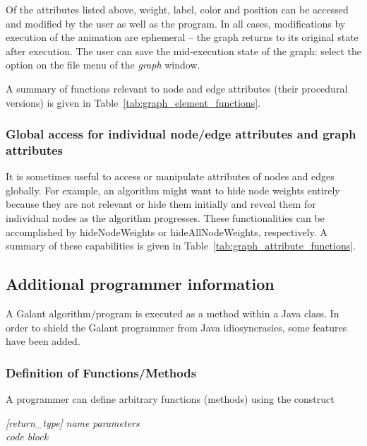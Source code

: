 Of the attributes listed above, weight, label, color and position can be
accessed and modified by the user as well as the program.
In all cases, modifications by execution of the animation are ephemeral
-- the graph returns to its original state after execution.
The user can save the mid-execution state of the graph:
select the  option on the file menu of the
\emph{graph} window.



A summary of functions relevant to node and edge attributes (their procedural versions)
is given in Table~\ref{tab:graph_element_functions}.

\subsubsection{Global access for individual node/edge attributes and graph attributes}



It is sometimes useful to access or manipulate attributes of nodes and edges
globally.
For example, an algorithm might want to hide node weights entirely
because they are not relevant
or hide them initially and reveal them for individual nodes as
the algorithm progresses.
These functionalities can be accomplished by
\textsf{hideNodeWeights} or \textsf{hideAllNodeWeights}, respectively.
A summary of these capabilities is given in Table~\ref{tab:graph_attribute_functions}.

\subsection{Additional programmer information}

A Galant algorithm/program is executed as a method within a Java class.
In order to shield the Galant programmer from Java idiosyncrasies,
some features have been added.

\subsubsection{Definition of Functions/Methods}\label{sec:functions}

A programmer can define arbitrary functions (methods) using the construct

 \textsl{[return\_type]} \textsl{name} \Code{(}
 \textsl{parameters} \Code{) \{} \\
 \hspace*{3em} \emph{code block} \\
 \Code{\}}

